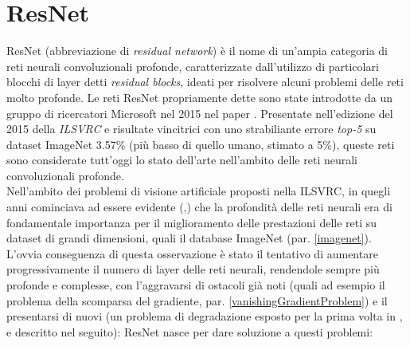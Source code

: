 \section{ResNet}
\label{resnet}
ResNet (abbreviazione di \textit{residual network}) è il nome di un'ampia categoria di reti neurali convoluzionali profonde, caratterizzate dall'utilizzo di particolari blocchi di layer detti \textit{residual blocks}, ideati per risolvere alcuni problemi delle reti molto profonde.
Le reti ResNet propriamente dette sono state introdotte da un gruppo di ricercatori Microsoft nel 2015 nel paper \cite{resnet}. Presentate nell'edizione del 2015 della \textit{ILSVRC} e risultate vincitrici con uno strabiliante errore \textit{top-5} su dataset ImageNet 3.57\% (più basso di quello umano, stimato a 5\%), queste reti sono considerate tutt'oggi lo stato dell'arte nell'ambito delle reti neurali convoluzionali profonde.\\

Nell'ambito dei problemi di visione artificiale proposti nella ILSVRC, in quegli anni cominciava ad essere evidente (\cite{googlenet},\cite{verydeep}) che la profondità delle reti neurali era di fondamentale importanza per il miglioramento delle prestazioni delle reti su dataset di grandi dimensioni, quali il database ImageNet (par. \ref{imagenet}).
L'ovvia conseguenza di questa osservazione è stato il tentativo di aumentare progressivamente il numero di layer delle reti neurali, rendendole sempre più profonde e complesse, con l'aggravarsi di ostacoli già noti (quali ad esempio il problema della scomparsa del gradiente, par. \ref{vanishingGradientProblem}) e il presentarsi di nuovi (un problema di degradazione esposto per la prima volta in \cite{highway}, e descritto nel seguito):
ResNet nasce per dare soluzione a questi problemi:


